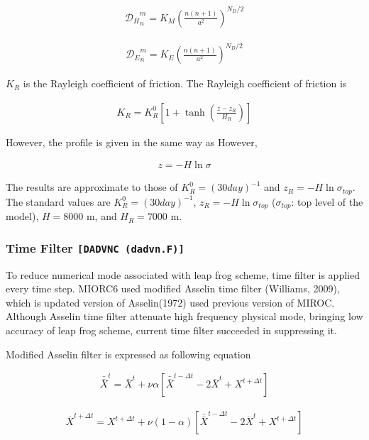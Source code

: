 \begin{eqnarray}
  {{\mathcal D}_H}_n^m = K_M \left( \frac{n(n+1)}{a^2} \right)^{N_D/2}
\end{eqnarray}

\begin{eqnarray}
  {{\mathcal D}_E}_n^m = K_E \left( \frac{n(n+1)}{a^2} \right)^{N_D/2}
\end{eqnarray}

\(K_R\) is the Rayleigh coefficient of friction. The Rayleigh
coefficient of friction is

\begin{eqnarray}
  K_R = K_R^0 \left[ 1+\tanh \left( \frac{z-z_R}{H_R} \right) \right]
\end{eqnarray}

However, the profile is given in the same way as However,

\begin{eqnarray}
  z = - H \ln \sigma
\end{eqnarray}

The results are approximate to those of \(K_R^0 = {(30day)}^{-1}\) and
\(z_R = -H \ln \sigma_{top}\). The standard values are
\(K_R^0 = {(30day)}^{-1}\), \(z_R = -H \ln \sigma_{top}\)
(\(\sigma_{top}\): top level of the model), \(H = 8000\) m, and
\(H_R = 7000\) m.

\hypertarget{time-filter-dadvnc-dadvn.f}{%
\subsubsection{\texorpdfstring{Time Filter
\texttt{{[}DADVNC\ (dadvn.F){]}}}{Time Filter {[}DADVNC (dadvn.F){]}}}\label{time-filter-dadvnc-dadvn.f}}

To reduce numerical mode associated with leap frog scheme, time filter
is applied every time step. MIORC6 used modified Asselin time filter
(Williams, 2009), which is updated version of Asselin(1972) used
previous version of MIROC. Although Asselin time filter attenuate high
frequency physical mode, bringing low accuracy of leap frog scheme,
current time filter succeeded in suppressing it.

Modified Asselin filter is expressed as following equation

\begin{eqnarray}
 \bar{\bar{X}}^t = \bar{X}^t + \nu\alpha[\bar{\bar{X}}^{t-\Delta t} -2 \bar{X}^t + X^{t+\Delta t}]
\end{eqnarray}

\begin{eqnarray}
 \bar{X}^{t+\Delta t} = X^{t+\Delta t} + \nu(1-\alpha)[\bar{\bar{X}}^{t-\Delta t} -2 \bar{X}^t + X^{t+\Delta t}]
\end{eqnarray}

